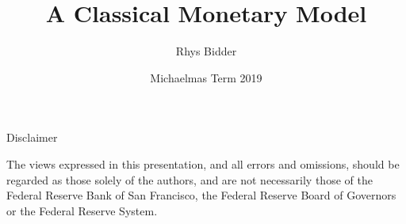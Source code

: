 \documentclass{beamer}
\begin{document}
\title[Classical Monetary Model]{A Classical Monetary Model}
\author[Bidder]{Rhys Bidder}
\date{Michaelmas Term 2019}
\maketitle


\begin{frame}{Disclaimer}

The views expressed in this presentation, and all errors and omissions, should be regarded as those solely of the authors, and are not necessarily those of the Federal Reserve Bank of San Francisco, the Federal Reserve Board of Governors or the Federal Reserve System.

\end{frame}




\end{document}
